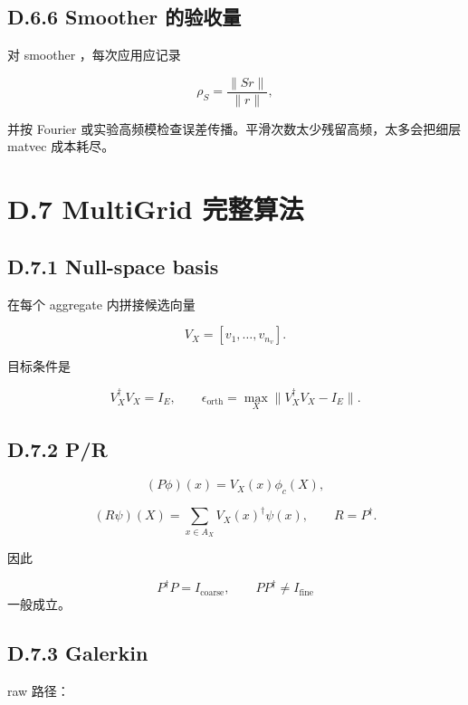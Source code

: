 \documentclass[UTF8,a4paper,10pt]{ctexart}
\DeclareRobustCommand{\pycode}[1]{\texorpdfstring{\texttt{\seqsplit{#1}}}{#1}}
\begin{document}
\subsection{D.6.6 Smoother 的验收量}
对 smoother \pycode{S}，每次应用应记录

\begin{displaymath}
\rho_S= \frac{\| S r\|}{\| r\|},
\end{displaymath}

并按 Fourier 或实验高频模检查误差传播。平滑次数太少残留高频，太多会把细层 matvec 成本耗尽。

\section{D.7 MultiGrid 完整算法}
\subsection{D.7.1 Null-space basis}
在每个 aggregate \pycode{A\_X} 内拼接候选向量

\begin{displaymath}
V_X=[v_1,\ldots,v_{n_v}].
\end{displaymath}

目标条件是

\begin{displaymath}
V_X^\dagger V_X=I_E, \qquad \epsilon_{\mathrm{orth}}= \max_X\| V_X^\dagger V_X-I_E\|.
\end{displaymath}

\subsection{D.7.2 P/R}
\begin{displaymath}
(P\phi)(x)=V_X(x)\phi_c(X),
\end{displaymath}

\begin{displaymath}
(R\psi)(X)= \sum_{x\in A_X}V_X(x)^\dagger\psi(x), \qquad R=P^\dagger.
\end{displaymath}

因此

\begin{displaymath}
P^\dagger P=I_{\mathrm{coarse}}, \qquad PP^\dagger\ne I_{\mathrm{fine}}
\end{displaymath} 一般成立。

\subsection{D.7.3 Galerkin}
raw 路径：
\end{document}
